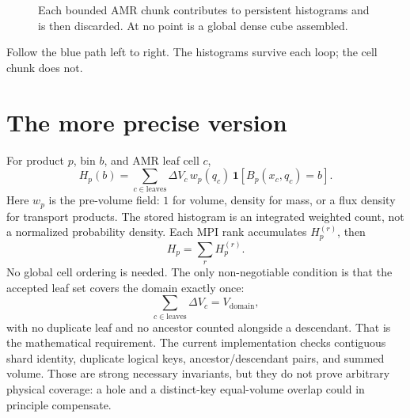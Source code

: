 \documentclass[11pt]{article}
\begin{document}
\begin{figure}[ht]
\centering
{}
\caption{Each bounded AMR chunk contributes to persistent histograms and is
then discarded. At no point is a global dense cube assembled. \schematicnote}
\end{figure}

Follow the blue path left to right. The histograms survive each loop; the cell
chunk does not.

\section{The more precise version}

For product \(p\), bin \(b\), and AMR leaf cell \(c\),
\[
H_p(b)=\sum_{c\in\mathrm{leaves}}\Delta V_c\,w_p(q_c)\,
\mathbf{1}\!\left[B_p(x_c,q_c)=b\right].
\]
Here \(w_p\) is the pre-volume field: \(1\) for volume, density for mass, or a
flux density for transport products. The stored histogram is an integrated
weighted count, not a normalized probability density.
Each MPI rank accumulates \(H_p^{(r)}\), then
\[
H_p=\sum_r H_p^{(r)}.
\]
No global cell ordering is needed. The only non-negotiable condition is that
the accepted leaf set covers the domain exactly once:
\[
\sum_{c\in\mathrm{leaves}}\Delta V_c = V_{\mathrm{domain}},
\]
with no duplicate leaf and no ancestor counted alongside a descendant.
That is the mathematical requirement. The current implementation checks
contiguous shard identity, duplicate logical keys, ancestor/descendant pairs,
and summed volume. Those are strong necessary invariants, but they do not
prove arbitrary physical coverage: a hole and a distinct-key equal-volume
overlap could in principle compensate.
\end{document}
